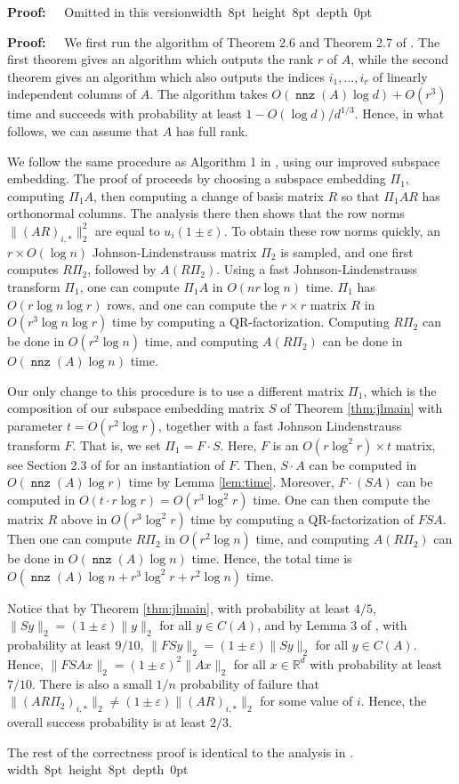 \documentclass{sig-alternate}
\DeclareMathOperator{\nnz}{\mathtt{nnz}}
\newcommand\STOComitedproof[1] {\ifSTOC \begin{proof} Omitted in this version\end{proof}\else #1 \fi }
\newcommand{\eps}{\varepsilon}
\def\FullBox{\hbox{\vrule width 8pt height 8pt depth 0pt}}
\def\qed{\ifmmode\qquad\FullBox\else{\unskip\nobreak\hfil
\penalty50\hskip1em\null\nobreak\hfil\FullBox
\parfillskip=0pt\finalhyphendemerits=0\endgraf}\fi}
\newenvironment{proof}{\begin{trivlist} \item {\bf Proof:~~}}
  {\qed\end{trivlist}}
\begin{document}
\STOComitedproof{
\begin{proof}
We first run the algorithm of Theorem 2.6 and Theorem 2.7 of \cite{ckl12}. The first theorem 
gives an algorithm which outputs the rank $r$ of $A$, while the second theorem gives an algorithm
which also outputs the indices $i_1, \ldots, i_r$ of linearly independent columns of $A$. The algorithm
takes $O(\nnz(A)\log d) + O(r^3)$ time and succeeds with probability at least $1-O(\log d)/d^{1/3}$.
Hence, in what follows, we can assume that $A$ has full rank. 

We follow the same procedure as Algorithm 1 in \cite{dmmw11}, using our improved subspace embedding.
The proof of \cite{dmmw11} proceeds by choosing a subspace embedding $\Pi_1$, computing $\Pi_1 A$,
then computing a change of basis matrix $R$ so that $\Pi_1 A R$ has orthonormal columns. The analysis
there then shows that the row norms $\|(AR)_{i, *}\|_2^2$ are equal to $u_i(1 \pm \eps)$. To obtain
these row norms quickly, an $r \times O(\log n)$ Johnson-Lindenstrauss matrix $\Pi_2$ is sampled,
and one first computes $R\Pi_2$, followed by $A(R\Pi_2)$. Using a fast Johnson-Lindenstrauss transform
$\Pi_1$, one can compute $\Pi_1 A$ in $O(nr \log n)$ time. $\Pi_1$ has $O(r \log n \log r)$ rows, and
one can compute the $r \times r$ matrix $R$ in $O(r^3 \log n \log r)$ time by computing a 
QR-factorization. Computing $R\Pi_2$
can be done in $O(r^2 \log n)$ time, and computing $A (R \Pi_2)$ can be done in $O(\nnz(A) \log n)$ time.

Our only change to this procedure is to use a different matrix $\Pi_1$, which is the composition
of our subspace embedding matrix $S$ of Theorem \ref{thm:jlmain} with parameter $t = O(r^2 \log r)$, together with a fast
Johnson Lindenstrauss transform $F$. That is, we set $\Pi_1 = F \cdot S$. Here, $F$ is an
$O(r \log^2 r) \times t$ matrix, see Section 2.3 of \cite{dmmw11} for an instantiation of $F$. 
Then, $S \cdot A$ can be computed in $O(\nnz(A) \log r)$ time by Lemma \ref{lem:time}. Moreover,
$F \cdot (SA)$ can be computed in $O(t \cdot r \log r) = O(r^3 \log^2 r)$ time. One can then 
compute the matrix $R$ above in $O(r^3 \log^2 r)$ time by computing a QR-factorization of $FSA$. Then
one can compute $R \Pi_2$ in $O(r^2 \log n)$ time, and computing $A (R \Pi_2)$ can be done in 
$O(\nnz(A) \log n)$ time.
Hence, the total time is $O(\nnz(A)\log n + r^3 \log^2 r + r^2 \log n)$ time. 

Notice that
by Theorem \ref{thm:jlmain}, with probability at least $4/5$, 
$\|Sy\|_2 = (1 \pm \eps)\|y\|_2$ for all $y \in C(A)$, and by
Lemma 3 of \cite{dmmw11}, with probability at least $9/10$, 
$\|FSy\|_2 = (1\pm \eps)\|Sy\|_2$ for all $y \in C(A)$. Hence,
$\|FSAx\|_2 = (1 \pm \eps)^2 \|Ax\|_2$ for all $x \in \mathbb{R}^d$ 
with probability at least $7/10$. There is
also a small $1/n$ probability of failure that 
$\|(AR\Pi_2)_{i, *}\|_2 \neq (1 \pm \eps)\|(AR)_{i, *}\|_2$ for
some value of $i$. Hence, the overall success probability is at least $2/3$. 

The rest of the correctness proof is identical to the analysis in \cite{dmmw11}. 
\end{proof}
} 
\end{document}
